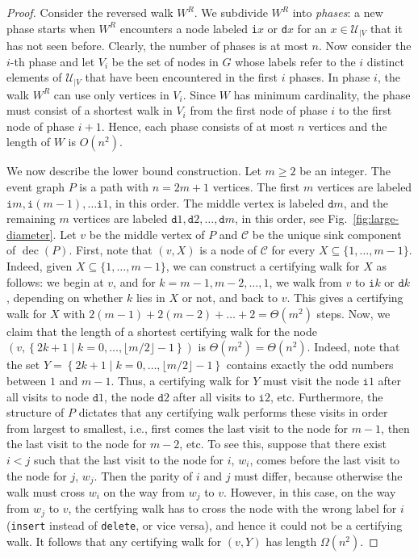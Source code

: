\documentclass[oribibl,envcountsect,envcountsame]{llncs}
\DeclareMathOperator{\dec}{dec}
\newcommand{\C}{\mathcal C}
\newcommand{\U}{\mathcal U}
\begin{document}
\begin{proof}
Consider the reversed walk $W^{R}$. We subdivide $W^{R}$ into \emph{phases}: 
a new phase starts when $W^{R}$ encounters a node labeled 
\texttt{i}$x$ or \texttt{d}$x$ for an $x \in \U_{|V}$ that it has not seen 
before. Clearly, the number of phases is at most $n$. 
Now consider the $i$-th phase and let $V_i$ be the set of nodes in $G$ 
whose labels refer to the $i$ distinct elements of $\U_{|V}$ that have been
encountered in the first $i$ phases. In phase $i$, the walk $W^{R}$ 
can use only vertices in $V_i$. Since $W$ has minimum cardinality, 
the phase must consist of a shortest walk in $V_i$ from the first node of
phase $i$ to the first node of phase $i+1$.
Hence, each phase consists of at most $n$ vertices and
the length of $W$ is $O(n^2)$.

We now describe the lower bound construction. 
Let $m \geq 2$ be an integer.
The event graph $P$  is a path with $n = 2m + 1$ vertices. The first $m$ 
vertices are labeled
$\texttt{i}m, \texttt{i}(m-1), \dots \texttt{i}1$, in this order. 
The middle vertex is labeled $\texttt{d}m$, and the remaining 
$m$ vertices are labeled $\texttt{d}1, \texttt{d}2, \dots, \texttt{d}m$, in this
order, see Fig.~\ref{fig:large-diameter}. 
Let $v$ be the middle vertex of $P$ and
$\C$ be the unique sink component of $\dec(P)$.
First, note that $(v, X)$ is a node of $\C$ for every 
$X \subseteq \{1, \ldots, m-1\}$. Indeed, given $X \subseteq \{1, \ldots, m-1\}$,
we can construct a certifying walk for $X$ as follows:
we begin at $v$, and for $k = m-1, m-2, \dots, 1$, we walk from $v$ to
$\texttt{i}k$ or $\texttt{d}k$, depending on whether $k$ lies in $X$ or 
not, and back to $v$. This gives a certifying walk for $X$  with 
$2(m-1) + 2(m-2) + \dots + 2 = \Theta(m^2)$
steps. 
Now, we claim that the length of a shortest certifying walk for the node 
$\left(v, 
\left\{2k + 1 \mid k = 0, \ldots, \lfloor m/2 \rfloor - 1 \right\}\right)$
is $\Theta(m^2) = \Theta(n^2)$. Indeed, note that the set 
$ Y = \left\{2k + 1 \mid k = 0, \ldots, \lfloor m/2 \rfloor - 1 \right\}$ 
contains exactly the odd numbers between $1$ and $m-1$. Thus, a certifying 
walk for $Y$ must visit the node $\texttt{i}1$ after all visits to
node $\texttt{d}1$, the node $\texttt{d}2$ after all visits to 
$\texttt{i}2$, etc. Furthermore, the structure of $P$ dictates that 
any certifying walk performs these visits in order from largest 
to smallest, i.e., first comes the last visit to the node for
$m-1$, then the last visit to the node for $m-2$, etc. 
To see this, suppose that there exist $i < j$
such that the last visit to the node for $i$, $w_i$, comes before 
the last visit to the node for $j$, $w_j$. Then the parity of $i$ 
and $j$ must differ, because otherwise the walk must cross $w_i$ 
on the way from $w_j$ to $v$. However, in this case, on the way 
from $w_j$ to $v$, the certfying walk has to cross the node with the 
wrong label for $i$ (\texttt{insert} instead of \texttt{delete}, or vice 
versa), and hence it could not be a certifying walk. It follows 
that any certifying walk for $(v,Y)$ has length $\Omega(n^2)$.


\end{proof}
\end{document}
